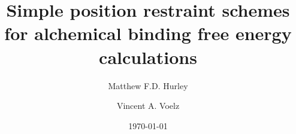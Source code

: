 \documentclass[%
 aip,
rsi,%
 amsmath,amssymb,
 reprint,%
]{revtex4-1}
\begin{document}

\title[Simple restraint schemes for binding free energies]{Simple position restraint schemes for alchemical binding free energy calculations}%




\author{Matthew F.D. Hurley}
\author{Vincent A. Voelz}


\date{\today}%
\end{document}
